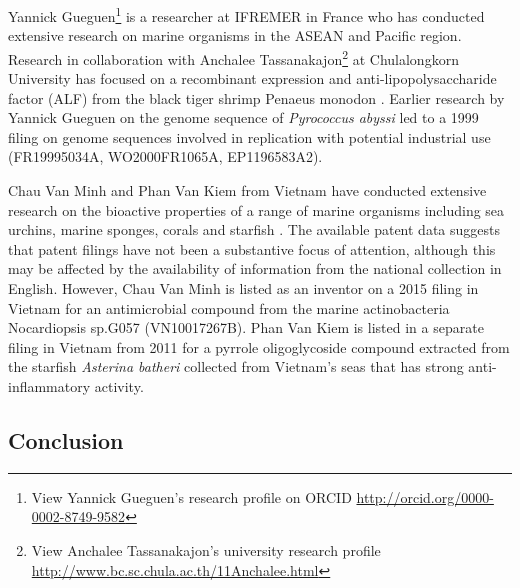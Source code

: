 \documentclass[]{book}
\let\rmarkdownfootnote\footnote%
\def\footnote{\protect\rmarkdownfootnote}
\theoremstyle{definition}
\theoremstyle{definition}
\theoremstyle{definition}
\theoremstyle{remark}
\begin{document}
Yannick Gueguen\footnote{View Yannick Gueguen's research profile on
  ORCID \url{http://orcid.org/0000-0002-8749-9582}} is a researcher at
IFREMER in France who has conducted extensive research on marine
organisms in the ASEAN and Pacific region. Research in collaboration
with Anchalee Tassanakajon\footnote{View Anchalee Tassanakajon's
  university research profile
  \url{http://www.bc.sc.chula.ac.th/11Anchalee.html}} at Chulalongkorn
University has focused on a recombinant expression and
anti-lipopolysaccharide factor (ALF) from the black tiger shrimp Penaeus
monodon \citep{Somboonwiwat_2005}. Earlier research by Yannick Gueguen
on the genome sequence of \emph{Pyrococcus abyssi} led to a 1999 filing
on genome sequences involved in replication with potential industrial
use (FR19995034A, WO2000FR1065A, EP1196583A2).

Chau Van Minh and Phan Van Kiem from Vietnam have conducted extensive
research on the bioactive properties of a range of marine organisms
including sea urchins, marine sponges, corals and starfish
\citep{Thao_2015, Thao_2015a, Kiem_2017, Ngoc_2017, Vien_2016}. The
available patent data suggests that patent filings have not been a
substantive focus of attention, although this may be affected by the
availability of information from the national collection in English.
However, Chau Van Minh is listed as an inventor on a 2015 filing in
Vietnam for an antimicrobial compound from the marine actinobacteria
Nocardiopsis sp.G057 (VN10017267B). Phan Van Kiem is listed in a
separate filing in Vietnam from 2011 for a pyrrole oligoglycoside
compound extracted from the starfish \emph{Asterina batheri} collected
from Vietnam's seas that has strong anti-inflammatory activity.

\hypertarget{conclusion-2}{%
\subsection{Conclusion}\label{conclusion-2}}
\end{document}
